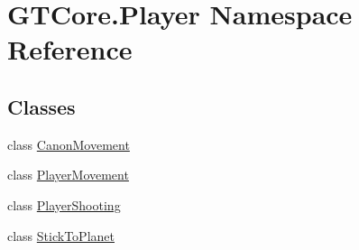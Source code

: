 \hypertarget{namespace_g_t_core_1_1_player}{}\section{G\+T\+Core.\+Player Namespace Reference}
\label{namespace_g_t_core_1_1_player}
\subsection*{Classes}
\begin{DoxyCompactItemize}
\item 
class \hyperlink{class_g_t_core_1_1_player_1_1_canon_movement}{Canon\+Movement}
\item 
class \hyperlink{class_g_t_core_1_1_player_1_1_player_movement}{Player\+Movement}
\item 
class \hyperlink{class_g_t_core_1_1_player_1_1_player_shooting}{Player\+Shooting}
\item 
class \hyperlink{class_g_t_core_1_1_player_1_1_stick_to_planet}{Stick\+To\+Planet}
\end{DoxyCompactItemize}
